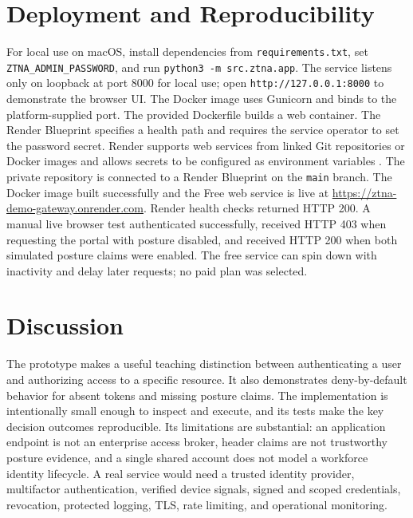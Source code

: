 \documentclass[conference]{IEEEtran}
\begin{document}
\section{Deployment and Reproducibility}
For local use on macOS, install dependencies from \texttt{requirements.txt}, set \texttt{ZTNA\_ADMIN\_PASSWORD}, and run \texttt{python3 -m src.ztna.app}. The service listens only on loopback at port 8000 for local use; open \texttt{http://127.0.0.1:8000} to demonstrate the browser UI. The Docker image uses Gunicorn and binds to the platform-supplied port. The provided Dockerfile builds a web container. The Render Blueprint specifies a health path and requires the service operator to set the password secret. Render supports web services from linked Git repositories or Docker images and allows secrets to be configured as environment variables \cite{renderWeb,renderEnv}. The private repository is connected to a Render Blueprint on the \texttt{main} branch. The Docker image built successfully and the Free web service is live at \url{https://ztna-demo-gateway.onrender.com}. Render health checks returned HTTP 200. A manual live browser test authenticated successfully, received HTTP 403 when requesting the portal with posture disabled, and received HTTP 200 when both simulated posture claims were enabled. The free service can spin down with inactivity and delay later requests; no paid plan was selected.

\section{Discussion}
The prototype makes a useful teaching distinction between authenticating a user and authorizing access to a specific resource. It also demonstrates deny-by-default behavior for absent tokens and missing posture claims. The implementation is intentionally small enough to inspect and execute, and its tests make the key decision outcomes reproducible. Its limitations are substantial: an application endpoint is not an enterprise access broker, header claims are not trustworthy posture evidence, and a single shared account does not model a workforce identity lifecycle. A real service would need a trusted identity provider, multifactor authentication, verified device signals, signed and scoped credentials, revocation, protected logging, TLS, rate limiting, and operational monitoring.
\end{document}
